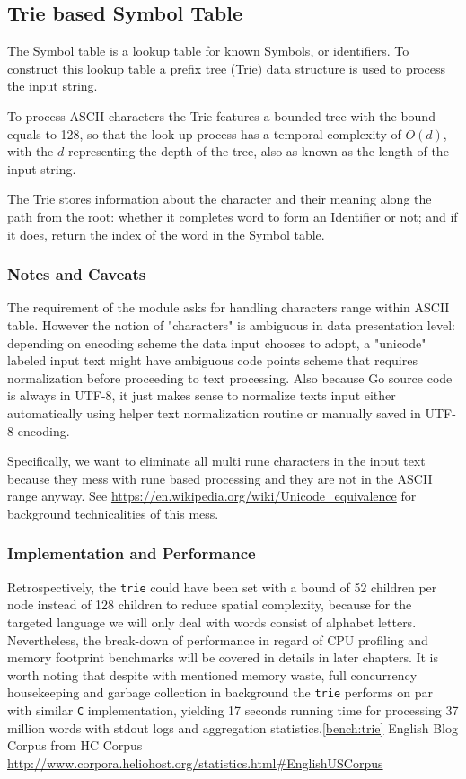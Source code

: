 \documentclass[%
 aip,
 jmp,%
 amsmath,amssymb,
 reprint,%
]{revtex4-1}
\begin{document}
\subsection{Trie based Symbol Table}

The Symbol table is a lookup table for known Symbols, or identifiers. To
construct this lookup table a prefix tree (Trie) data structure is used to
process the input string.

To process ASCII characters the Trie features a bounded tree with the bound
equals to 128, so that the look up process has a temporal complexity of $O(d)$,
with the $d$ representing the depth of the tree, also as known as the length of
the input string.

The Trie stores information about the character and their meaning along the
path from the root: whether it completes word to form an Identifier or not;
and if it does, return the index of the word in the Symbol table.

\subsubsection{Notes and Caveats}
The requirement of the module asks for handling characters range within ASCII
table. However the notion of "characters" is ambiguous in data presentation
level: depending on encoding scheme the data input chooses to adopt, a
"unicode" labeled input text might have ambiguous code points scheme that
requires normalization before proceeding to text processing. Also because Go
source code is always in UTF-8, it just makes sense to normalize texts input
either automatically using helper text normalization routine or manually saved
in UTF-8 encoding.

Specifically, we want to eliminate all multi rune
characters in the input text because they mess with rune based processing and
they are not in the ASCII range anyway.
See \url{https://en.wikipedia.org/wiki/Unicode_equivalence}
for background technicalities of this mess.

\subsubsection{Implementation and Performance}
Retrospectively, the \texttt{trie} could have been set with a bound of 52 children per node instead of 128 children to reduce spatial complexity, because for the targeted language we will only deal with words consist of alphabet letters.
Nevertheless, the break-down of performance in regard of CPU profiling and memory footprint benchmarks will be covered in details in later chapters. It is worth noting that despite with mentioned memory waste, full concurrency housekeeping and garbage collection in background the \texttt{trie} performs on par with similar \texttt{C} implementation, yielding 17 seconds running time for processing 37 million words with stdout logs and aggregation statistics.\ref{bench:trie} \footnotesize{English Blog Corpus from HC Corpus \url{http://www.corpora.heliohost.org/statistics.html#EnglishUSCorpus}}
\end{document}
